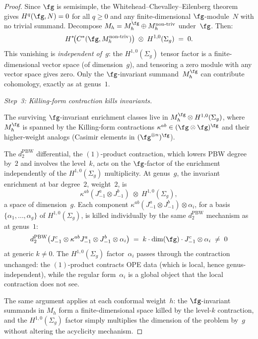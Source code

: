 \begin{proof}
Since $\fg$ is semisimple, the
Whitehead--Chevalley--Eilenberg theorem gives
$H^q(\fg, N) = 0$ for all $q \geq 0$ and any
finite-dimensional $\fg$-module~$N$ with no trivial
summand.  Decompose $M_h = M_h^{\fg} \oplus
M_h^{\mathrm{non\text{-}triv}}$ under~$\fg$.  Then:
\[
H^*\!\bigl(C^*(\fg, M_h^{\mathrm{non\text{-}triv}})\bigr)
\;\otimes\; H^{1,0}(\Sigma_g) \;=\; 0.
\]
This vanishing is \emph{independent of~$g$}: the
$H^{1,0}(\Sigma_g)$ tensor factor is a
finite-dimensional vector space (of dimension~$g$),
and tensoring a zero module with any vector space
gives zero.  Only the $\fg$-invariant
summand~$M_h^{\fg}$ can contribute cohomology, exactly
as at genus~$1$.

\medskip
\emph{Step~3: Killing-form contraction kills
invariants.}

The surviving $\fg$-invariant enrichment classes live in
$M_h^{\fg} \otimes H^{1,0}(\Sigma_g)$, where $M_h^{\fg}$
is spanned by the Killing-form contractions
$\kappa^{ab} \in (\fg \otimes \fg)^{\fg}$ and their
higher-weight analogs (Casimir elements in
$(\fg^{\otimes n})^{\fg}$).

The $d_2^{\mathrm{PBW}}$ differential, the $(1)$-product
contraction, which lowers PBW degree by~$2$ and
involves the level~$k$, acts on the $\fg$-factor of
the enrichment independently of the
$H^{1,0}(\Sigma_g)$ multiplicity.  At genus~$g$, the
invariant enrichment at bar degree~$2$, weight~$2$, is
\[
\kappa^{ab}(J^a_{-1} \otimes J^b_{-1})
\;\otimes\; H^{1,0}(\Sigma_g),
\]
a space of dimension~$g$.  Each component
$\kappa^{ab}(J^a_{-1} \otimes J^b_{-1}) \otimes \alpha_i$,
for a basis $\{\alpha_1, \ldots, \alpha_g\}$ of
$H^{1,0}(\Sigma_g)$, is killed individually by the same
$d_2^{\mathrm{PBW}}$ mechanism as at genus~$1$:
\[
d_2^{\mathrm{PBW}}\bigl(
J^c_{-1} \otimes \kappa^{ab} J^a_{-1}
\otimes J^b_{-1} \otimes \alpha_i\bigr)
\;=\;
k \cdot \dim(\fg) \cdot J^c_{-1} \otimes \alpha_i
\;\neq\; 0
\]
at generic $k \neq 0$.  The $H^{1,0}(\Sigma_g)$
factor~$\alpha_i$ passes through the contraction
unchanged: the $(1)$-product contracts OPE data (which
is local, hence genus-independent), while the
regular form~$\alpha_i$ is a global object that the
local contraction does not see.

The same argument applies at each conformal weight~$h$:
the $\fg$-invariant summands in $M_h$ form a
finite-dimensional space killed by the level-$k$
contraction, and the $H^{1,0}(\Sigma_g)$ factor
simply multiplies the dimension of the problem by~$g$
without altering the acyclicity mechanism.


\end{proof}
